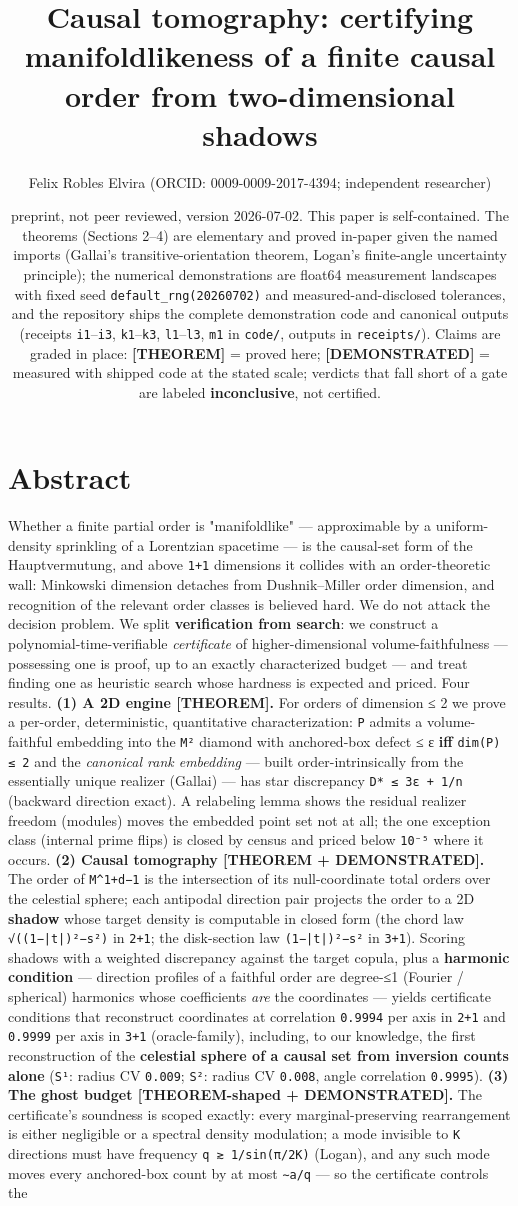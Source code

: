 \documentclass[11pt]{article}
\title{Causal tomography: certifying manifoldlikeness of a finite causal order from two-dimensional shadows}
\author{Felix Robles Elvira (ORCID: 0009-0009-2017-4394; independent researcher)}
\date{\small preprint, not peer reviewed, version 2026-07-02. This paper is self-contained. The theorems (Sections 2–4) are elementary and proved in-paper given the named imports (Gallai's transitive-orientation theorem, Logan's finite-angle uncertainty principle); the numerical demonstrations are float64 measurement landscapes with fixed seed \texttt{default\_rng(20260702)} and measured-and-disclosed tolerances, and the repository ships the complete demonstration code and canonical outputs (receipts \texttt{i1}–\texttt{i3}, \texttt{k1}–\texttt{k3}, \texttt{l1}–\texttt{l3}, \texttt{m1} in \texttt{code/}, outputs in \texttt{receipts/}). Claims are graded in place: \textbf{[THEOREM]} = proved here; \textbf{[DEMONSTRATED]} = measured with shipped code at the stated scale; verdicts that fall short of a gate are labeled \textbf{inconclusive}, not certified.}
\begin{document}
\maketitle

\section*{Abstract}
Whether a finite partial order is "manifoldlike" — approximable by a uniform-density sprinkling of a Lorentzian spacetime — is the causal-set form of the Hauptvermutung, and above \texttt{1+1} dimensions it collides with an order-theoretic wall: Minkowski dimension detaches from Dushnik–Miller order dimension, and recognition of the relevant order classes is believed hard. We do not attack the decision problem. We split \textbf{verification from search}: we construct a polynomial-time-verifiable \emph{certificate} of higher-dimensional volume-faithfulness — possessing one is proof, up to an exactly characterized budget — and treat finding one as heuristic search whose hardness is expected and priced. Four results. \textbf{(1) A 2D engine [THEOREM].} For orders of dimension ≤ 2 we prove a per-order, deterministic, quantitative characterization: \texttt{P} admits a volume-faithful embedding into the \texttt{M²} diamond with anchored-box defect ≤ ε \textbf{iff} \texttt{dim(P) ≤ 2} and the \emph{canonical rank embedding} — built order-intrinsically from the essentially unique realizer (Gallai) — has star discrepancy \texttt{D* ≤ 3ε + 1/n} (backward direction exact). A relabeling lemma shows the residual realizer freedom (modules) moves the embedded point set not at all; the one exception class (internal prime flips) is closed by census and priced below \texttt{10⁻⁵} where it occurs. \textbf{(2) Causal tomography [THEOREM + DEMONSTRATED].} The order of \texttt{M\textasciicircum{}{1+d−1}} is the intersection of its null-coordinate total orders over the celestial sphere; each antipodal direction pair projects the order to a 2D \textbf{shadow} whose target density is computable in closed form (the chord law \texttt{√((1−|t|)²−s²)} in \texttt{2+1}; the disk-section law \texttt{(1−|t|)²−s²} in \texttt{3+1}). Scoring shadows with a weighted discrepancy against the target copula, plus a \textbf{harmonic condition} — direction profiles of a faithful order are degree-≤1 (Fourier / spherical) harmonics whose coefficients \emph{are} the coordinates — yields certificate conditions that reconstruct coordinates at correlation \texttt{0.9994} per axis in \texttt{2+1} and \texttt{0.9999} per axis in \texttt{3+1} (oracle-family), including, to our knowledge, the first reconstruction of the \textbf{celestial sphere of a causal set from inversion counts alone} (\texttt{S¹}: radius CV \texttt{0.009}; \texttt{S²}: radius CV \texttt{0.008}, angle correlation \texttt{0.9995}). \textbf{(3) The ghost budget [THEOREM-shaped + DEMONSTRATED].} The certificate's soundness is scoped exactly: every marginal-preserving rearrangement is either negligible or a spectral density modulation; a mode invisible to \texttt{K} directions must have frequency \texttt{q ≳ 1/sin(π/2K)} (Logan), and any such mode moves every anchored-box count by at most \texttt{∼a/q} — so the certificate controls the 
\end{document}
